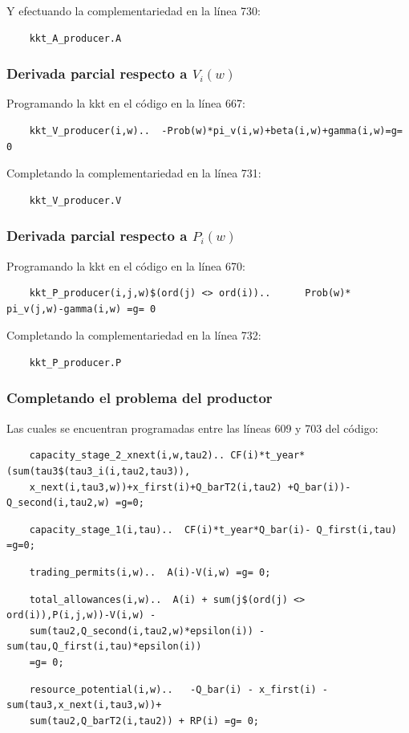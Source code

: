 Y efectuando la complementariedad en la línea 730:
\begin{verbatim}
    kkt_A_producer.A
\end{verbatim}

\subsubsection{Derivada parcial respecto a $V_i(w)$}
Programando la kkt en el código en la línea 667:
\begin{verbatim}
    kkt_V_producer(i,w)..  -Prob(w)*pi_v(i,w)+beta(i,w)+gamma(i,w)=g= 0
\end{verbatim}

Completando la complementariedad en la línea 731:
\begin{verbatim}
    kkt_V_producer.V
\end{verbatim}

\subsubsection{Derivada parcial respecto a $P_i(w)$}

Programando la kkt en el código en la línea 670:
\begin{verbatim}
    kkt_P_producer(i,j,w)$(ord(j) <> ord(i))..      Prob(w)* pi_v(j,w)-gamma(i,w) =g= 0
\end{verbatim}

Completando la complementariedad en la línea 732:
\begin{verbatim}
    kkt_P_producer.P  
\end{verbatim}

\subsubsection{Completando el problema del productor}

Las cuales se encuentran programadas entre las líneas 609 y 703 del código:

\begin{verbatim}
    capacity_stage_2_xnext(i,w,tau2).. CF(i)*t_year*(sum(tau3$(tau3_i(i,tau2,tau3)),
    x_next(i,tau3,w))+x_first(i)+Q_barT2(i,tau2) +Q_bar(i))-Q_second(i,tau2,w) =g=0;
\end{verbatim}
\begin{verbatim}
    capacity_stage_1(i,tau)..  CF(i)*t_year*Q_bar(i)- Q_first(i,tau) =g=0;
\end{verbatim}
\begin{verbatim}
    trading_permits(i,w)..  A(i)-V(i,w) =g= 0;
\end{verbatim}
\begin{verbatim}
    total_allowances(i,w)..  A(i) + sum(j$(ord(j) <> ord(i)),P(i,j,w))-V(i,w) - 
    sum(tau2,Q_second(i,tau2,w)*epsilon(i)) - sum(tau,Q_first(i,tau)*epsilon(i))   
    =g= 0;
\end{verbatim}
\begin{verbatim}
    resource_potential(i,w)..   -Q_bar(i) - x_first(i) - sum(tau3,x_next(i,tau3,w))+
    sum(tau2,Q_barT2(i,tau2)) + RP(i) =g= 0;
\end{verbatim}

